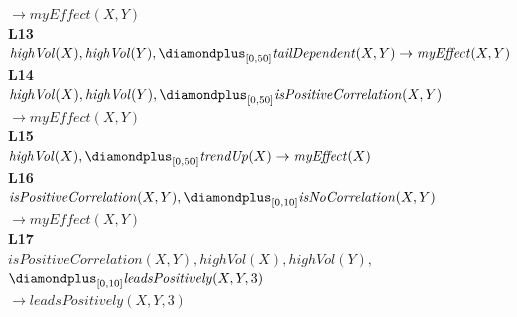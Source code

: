 \begin{figure}[t]
{\begin{minipage}{0.95\textwidth}
\hspace*{1.5em}\hspace*{3em}\mbox{$\to \mathit{myEffect}(X,Y)$}\\[4pt]
\textbf{L13}\\
\hspace*{1.5em}\mbox{$\mathit{highVol}(X), \mathit{highVol}(Y), \diamondplus_{[0,50]} \mathit{tailDependent}(X,Y) \to \mathit{myEffect}(X,Y)$}\\[4pt]
\textbf{L14}\\
\hspace*{1.5em}\mbox{$\mathit{highVol}(X), \mathit{highVol}(Y), \diamondplus_{[0,50]} \mathit{isPositiveCorrelation}(X,Y)$}\\
\hspace*{1.5em}\hspace*{3em}\mbox{$\to \mathit{myEffect}(X,Y)$}\\[4pt]
\textbf{L15}\\
\hspace*{1.5em}\mbox{$\mathit{highVol}(X), \diamondplus_{[0,50]} \mathit{trendUp}(X) \to \mathit{myEffect}(X)$}\\[4pt]
\textbf{L16}\\
\hspace*{1.5em}\mbox{$\mathit{isPositiveCorrelation}(X,Y), \diamondplus_{[0,10]} \mathit{isNoCorrelation}(X,Y)$}\\
\hspace*{1.5em}\hspace*{3em}\mbox{$\to \mathit{myEffect}(X,Y)$}\\[4pt]
\textbf{L17}\\
\hspace*{1.5em}\mbox{$\mathit{isPositiveCorrelation}(X,Y), \mathit{highVol}(X), \mathit{highVol}(Y),$}\\
\hspace*{1.5em}\hspace*{1.5em}\mbox{$\diamondplus_{[0,10]} \mathit{leadsPositively}(X,Y,3)$}\\
\hspace*{1.5em}\hspace*{3em}\mbox{$\to \mathit{leadsPositively}(X,Y,3)$}\\[4pt]

\end{minipage}}
\end{figure}
